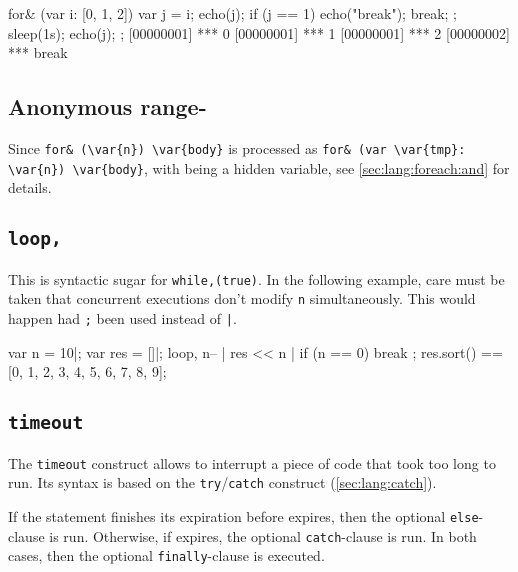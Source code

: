 \begin{urbiscript}
for& (var i: [0, 1, 2])
{
  var j = i;
  echo(j);
  if (j == 1)
  {
    echo("break");
    break;
  };
  sleep(1s);
  echo(j);
};
[00000001] *** 0
[00000001] *** 1
[00000001] *** 2
[00000002] *** break
\end{urbiscript}

\subsection{Anonymous range-\forAnd}
\label{sec:lang:forn:and}

Since \lstinline|for& (\var{n}) \var{body}| is processed as
\lstinline|for& (var \var{tmp}: \var{n}) \var{body}|, with  being a
hidden variable, see \autoref{sec:lang:foreach:and} for details.


\subsection{\lstinline{loop,}}
\label{sec:lang:loop:comma}
\experimentalremoved{}

This is syntactic sugar for \lstinline|while,(true)|.  In the following
example, care must be taken that concurrent executions don't modify
\lstinline{n} simultaneously.  This would happen had \lstinline|;| been used
instead of \lstinline'|'.

\begin{urbiassert}
{
  var n = 10|;
  var res = []|;
  loop,
  {
    n-- |
    res << n |
    if (n == 0)
      break
  };
  res.sort()
}
==
[0, 1, 2, 3, 4, 5, 6, 7, 8, 9];
\end{urbiassert}

\subsection{\lstinline{timeout}}
\label{sec:lang:timeout}

The \lstinline{timeout} construct allows to interrupt a piece of code that
took too long to run.  Its syntax is based on the
\lstinline{try}/\lstinline{catch} construct (\autoref{sec:lang:catch}).



If the statement finishes its expiration before  expires, then
the optional \lstinline{else}-clause is run.  Otherwise, if 
expires, the optional \lstinline{catch}-clause is run.  In both cases, then
the optional \lstinline{finally}-clause is executed.

